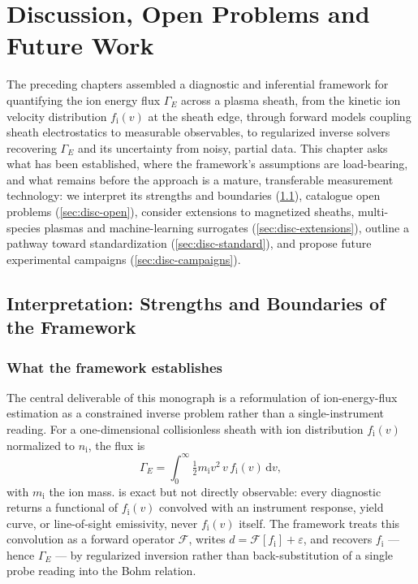 \chapter{Discussion, Open Problems and Future Work}
\label{ch:discussion}

The preceding chapters assembled a diagnostic and inferential framework for quantifying the ion energy flux $\Gamma_{E}$ across a plasma sheath, from the kinetic ion velocity distribution $f_{\mathrm{i}}(v)$ at the sheath edge, through forward models coupling sheath electrostatics to measurable observables, to regularized inverse solvers recovering $\Gamma_{E}$ and its uncertainty from noisy, partial data. This chapter asks what has been established, where the framework's assumptions are load-bearing, and what remains before the approach is a mature, transferable measurement technology: we interpret its strengths and boundaries (\cref{sec:disc-interp}), catalogue open problems (\cref{sec:disc-open}), consider extensions to magnetized sheaths, multi-species plasmas and machine-learning surrogates (\cref{sec:disc-extensions}), outline a pathway toward standardization (\cref{sec:disc-standard}), and propose future experimental campaigns (\cref{sec:disc-campaigns}).

\section{Interpretation: Strengths and Boundaries of the Framework}
\label{sec:disc-interp}

\subsection{What the framework establishes}

The central deliverable of this monograph is a reformulation of ion-energy-flux estimation as a constrained inverse problem rather than a single-instrument reading. For a one-dimensional collisionless sheath with ion distribution $f_{\mathrm{i}}(v)$ normalized to $n_{\mathrm{i}}$, the flux is
\begin{equation}
\Gamma_{E} = \int_{0}^{\infty} \tfrac{1}{2} m_{\mathrm{i}} v^{2} \, v \, f_{\mathrm{i}}(v) \, \mathrm{d}v ,
\label{eq:disc-gammaE}
\end{equation}
with $m_{\mathrm{i}}$ the ion mass.  is exact but not directly observable: every diagnostic returns a functional of $f_{\mathrm{i}}(v)$ convolved with an instrument response, yield curve, or line-of-sight emissivity, never $f_{\mathrm{i}}(v)$ itself. The framework treats this convolution as a forward operator $\mathcal{F}$, writes $d = \mathcal{F}[f_{\mathrm{i}}] + \varepsilon$, and recovers $f_{\mathrm{i}}$ — hence $\Gamma_{E}$ — by regularized inversion rather than back-substitution of a single probe reading into the Bohm relation.

